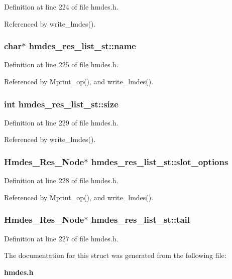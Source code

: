 Definition at line 224 of file hmdes.h.

Referenced by write\_\-lmdes().
\subsubsection{\setlength{\rightskip}{0pt plus 5cm}char$\ast$ \bf{hmdes\_\-res\_\-list\_\-st::name}}\label{structhmdes__res__list__st_85c71cd8dd014a46e6201d4b1016655a}




Definition at line 225 of file hmdes.h.

Referenced by Mprint\_\-op(), and write\_\-lmdes().
\subsubsection{\setlength{\rightskip}{0pt plus 5cm}int \bf{hmdes\_\-res\_\-list\_\-st::size}}\label{structhmdes__res__list__st_36fe307b3277c48543f27d9816ec89df}




Definition at line 229 of file hmdes.h.

Referenced by write\_\-lmdes().
\subsubsection{\setlength{\rightskip}{0pt plus 5cm}\bf{Hmdes\_\-Res\_\-Node}$\ast$ \bf{hmdes\_\-res\_\-list\_\-st::slot\_\-options}}\label{structhmdes__res__list__st_5eba31ed560a7c235fa970afa85df1c3}




Definition at line 228 of file hmdes.h.

Referenced by Mprint\_\-op(), and write\_\-lmdes().
\subsubsection{\setlength{\rightskip}{0pt plus 5cm}\bf{Hmdes\_\-Res\_\-Node}$\ast$ \bf{hmdes\_\-res\_\-list\_\-st::tail}}\label{structhmdes__res__list__st_7c44eb3335628d3d3fbf11a632f11e11}




Definition at line 227 of file hmdes.h.

The documentation for this struct was generated from the following file:\begin{CompactItemize}
\item 
\bf{hmdes.h}\end{CompactItemize}
